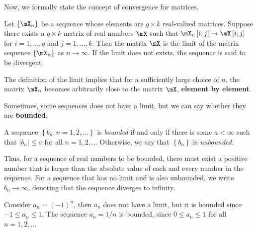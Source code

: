 \documentclass[english,12pt]{book}\usepackage[]{graphicx}\usepackage[]{xcolor}
\begin{document}
Now, we formally state the concept of convergence for matrices. 

\begin{definition}
Let $\left\lbrace\mX_n \right\rbrace$ be a sequence whose elements are $q\times k$ real-valued matrices. Suppose there exists a $q\times k$ matrix of real numbers $\mX$ such that $\mX_n\left[i, j\right]\to \mX\left[i, j\right]$ for $i = 1,...,q$ and $j = 1,...,k$. Then the matrix $\mX$ is the limit of the matrix sequence $\left\lbrace\mX_n \right\rbrace$ as $n\to \infty$. If the limit does not exists, the sequence is said to be divergent
\end{definition}

The definition of the limit implies that for a sufficiently large choice of $n$, the matrix $\mX_n$ becomes arbitrarily close to the matrix $\mX$, \textbf{element by element}.


Sometimes, some sequences does not have a limit, but we can say whether they are \textbf{bounded}: 

\begin{definition}\label{definition:bounded_sequence}
 A  sequence $\left\lbrace b_n: n = 1,2,... \right\rbrace$ is \emph{bounded} if and only if there is some $a < \infty$ such that $\left|b_n\right|\leq a$ for all $n = 1,2,...$ Otherwise, we say that $\left\lbrace b_n \right\rbrace$ is \emph{unbounded}.
\end{definition}

Thus, for a sequence of real numbers to be bounded, there must exist a positive number that is larger than the absolute value of each and every number in the sequence. For a sequence that has no limit and is also unbounded, we write $b_n \to \infty$, denoting that the sequence diverges to infinity. 


\begin{example}
Consider $a_n = (-1)^n$, then $a_n$ does not have a limit, but it is bounded since $-1 \leq a_n \leq 1$. The sequence $a_n = 1/n$ is bounded, since $0 \leq a_n\leq 1$ for all $n = 1,2,...$
\end{example}
\end{document}
